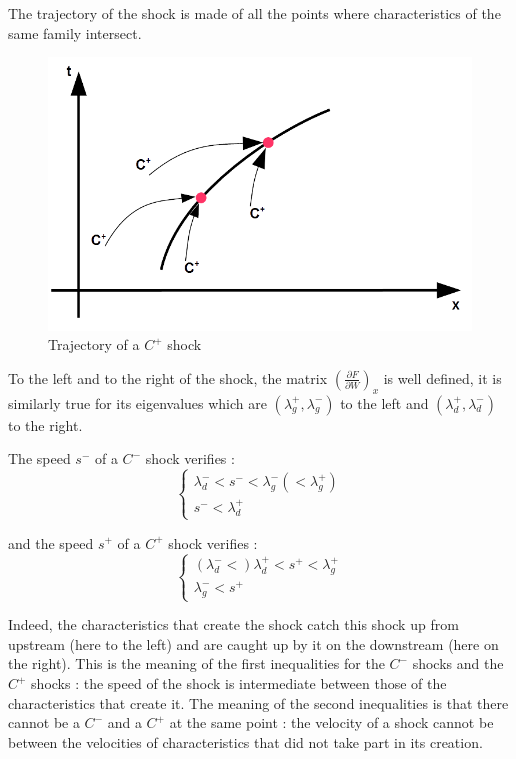 The trajectory of the shock is made of all the points where characteristics of the same family intersect.

\begin{figure}[H]
 \begin{center}
  \includegraphics[width=\textwidth]{Figures/Trajec_Choc.png}
  \caption{Trajectory of a $C^+$ shock}
 \end{center}
\end{figure}

To the left and to the right of the shock, the matrix $\left ( \frac{\partial F}{\partial W} \right )_x$ is well defined, it is similarly true for its eigenvalues which are $(\lambda_{g}^+,\lambda_{g}^-)$ to the left and $(\lambda_{d}^+,\lambda_{d}^-)$ to the right.

The speed $s^-$ of a $C^-$ shock verifies :
\begin{equation}
  \left \lbrace
  \begin{array}{l}
    \lambda_{d}^- < s^- < \lambda_{g}^- (< \lambda_{g}^+) \\
    s^- < \lambda_{d}^+
  \end{array}
 \right.
\end{equation}

and the speed $s^+$ of a $C^+$ shock verifies :
\begin{equation}
  \left \lbrace
  \begin{array}{l}
    (\lambda_{d}^- < ) \lambda_{d}^+ < s^+ < \lambda_{g}^+  \\
    \lambda_{g}^- < s^+
  \end{array}
 \right.
\end{equation}

Indeed, the characteristics that create the shock catch this shock up from upstream (here to the left) and are caught up by it on the downstream (here on the right). This is the meaning of the first inequalities for the $C^-$ shocks and the $C^+$ shocks : the speed of the shock is intermediate between those of the characteristics that create it. The meaning of the second inequalities is that there cannot be a $C^-$ and a $C^+$ at the same point : the velocity of a shock cannot be between the velocities of characteristics that did not take part in its creation.

